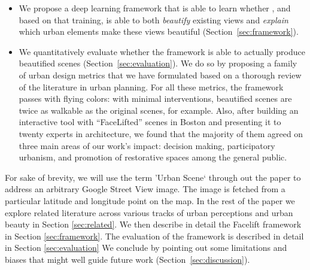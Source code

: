 \begin{itemize}
\item We propose a deep learning framework that is able to learn whether , and based on that training, is able to both \emph{beautify} existing views and \emph{explain} which urban elements  make these views beautiful (Section~\ref{sec:framework}). 

\item We quantitatively evaluate whether the framework is able to actually produce beautified scenes (Section~\ref{sec:evaluation}). We do so by proposing a family of  urban design metrics that we have formulated based on a thorough review of the literature in urban planning. For all these  metrics, the framework passes with flying colors: with minimal interventions, beautified scenes are twice as walkable as the original scenes, for example. Also, after building an interactive tool with ``FaceLifted'' scenes in Boston and presenting it to twenty experts in architecture,  we found that the majority of them agreed on three main areas of our work's impact: decision making, participatory urbanism, and promotion of restorative spaces among the general public. 

\end{itemize}
For sake of brevity, we will use the term 'Urban Scene` through out the paper to address an arbitrary Google Street View image. The image is fetched from a particular latitude and longitude point on the map. 
In the rest of the paper we explore related literature across various tracks of urban perceptions and urban beauty in Section \ref{sec:related}. We then describe in detail the Facelift framework in Section \ref{sec:framework}. The evaluation of the framework is described in detail in Section \ref{sec:evaluation} We conclude by pointing out some limitations and biases that might well guide future work (Section~\ref{sec:discussion}).




